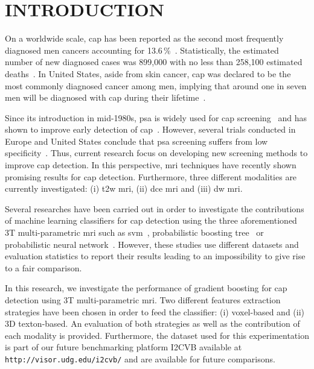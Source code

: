 \section{INTRODUCTION}\label{sec:introduction}

On a worldwide scale, \ac{cap} has been reported as the second most frequently diagnosed men cancers accounting for 13.6\,\%~\cite{Ferlay2010}. Statistically, the estimated number of new diagnosed cases was 899,000 with no less than 258,100 estimated deaths~\cite{Ferlay2010}. In United States, aside from skin cancer, \ac{cap} was declared to be the most commonly diagnosed cancer among men, implying that around one in seven men will be diagnosed with \ac{cap} during their lifetime~\cite{Siegel2014}.

Since its introduction in mid-1980s, \ac{psa} is widely used for \ac{cap} screening~\cite{Etzioni2002} and has shown to improve early detection of \ac{cap}~\cite{Chou2011}. However, several trials conducted in Europe and United States conclude that \ac{psa} screening suffers from low specificity~\cite{Andriole2009,Hugosson2010,Schroeder2012}. Thus, current research focus on developing new screening methods to improve \ac{cap} detection. In this perspective, \Ac{mri} techniques have recently shown promising results for \ac{cap} detection. Furthermore, three different modalities are currently investigated: (i) \ac{t2w} \ac{mri}, (ii) \ac{dce} \ac{mri} and (iii) \ac{dw} \ac{mri}.

Several researches have been carried out in order to investigate the contributions of machine learning classifiers for \ac{cap} detection using the three aforementioned 3T multi-parametric \ac{mri} such as \ac{svm}~\cite{Litjens2011,Litjens2012a,Litjens2014,Liu2013,Peng2013}, probabilistic boosting tree~\cite{Viswanath2011} or probabilistic neural network~\cite{Viswanath2011}. However, these studies use different datasets and evaluation statistics to report their results leading to an impossibility to give rise to a fair comparison.

In this research, we investigate the performance of gradient boosting for \ac{cap} detection using 3T multi-parametric \ac{mri}. Two different features extraction strategies have been chosen in order to feed the classifier: (i) voxel-based and (ii) 3D texton-based. An evaluation of both strategies as well as the contribution of each modality is provided. Furthermore, the dataset used for this experimentation is part of our future benchmarking platform I2CVB available at {\tt http://visor.udg.edu/i2cvb/} and are available for future comparisons.

